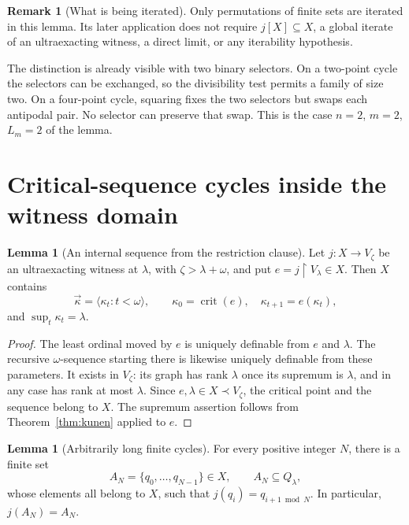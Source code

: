 \documentclass[11pt,letterpaper]{article}
\theoremstyle{definition}
\newtheorem{lemma}[definition]{Lemma}
\newcommand{\crit}{\operatorname{crit}}
\newcommand{\restr}{\mathbin{\upharpoonright}}
\newtheorem{remark}[definition]{Remark}
\begin{document}
\begin{remark}[What is being iterated]
Only permutations of finite sets are iterated in this lemma. Its later application does not require $j[X]\subseteq X$, a global iterate of an ultraexacting witness, a direct limit, or any iterability hypothesis.
\end{remark}

The distinction is already visible with two binary selectors. On a two-point cycle the selectors can be exchanged, so the divisibility test permits a family of size two. On a four-point cycle, squaring fixes the two selectors but swaps each antipodal pair. No selector can preserve that swap. This is the case $n=2$, $m=2$, $L_m=2$ of the lemma.

\section{Critical-sequence cycles inside the witness domain}\label{sec:cycles}

\begin{lemma}[An internal sequence from the restriction clause]\label{lem:sequence}
Let $j:X\to V_\zeta$ be an ultraexacting witness at $\lambda$, with $\zeta>\lambda+\omega$, and put $e=j\restr V_\lambda\in X$. Then $X$ contains
\[
 \vec\kappa=\langle\kappa_t:t<\omega\rangle,
 \qquad \kappa_0=\crit(e),\quad \kappa_{t+1}=e(\kappa_t),
\]
and $\sup_t\kappa_t=\lambda$.
\end{lemma}

\begin{proof}
The least ordinal moved by $e$ is uniquely definable from $e$ and $\lambda$. The recursive $\omega$-sequence starting there is likewise uniquely definable from these parameters. It exists in $V_\zeta$: its graph has rank $\lambda$ once its supremum is $\lambda$, and in any case has rank at most $\lambda$. Since $e,\lambda\in X\prec V_\zeta$, the critical point and the sequence belong to $X$. The supremum assertion follows from Theorem~\ref{thm:kunen} applied to $e$.
\end{proof}

\begin{lemma}[Arbitrarily long finite cycles]\label{lem:cycles}
For every positive integer $N$, there is a finite set
\[
 A_N=\{q_0,\ldots,q_{N-1}\}\in X,
 \qquad A_N\subseteq Q_\lambda,
\]
whose elements all belong to $X$, such that $j(q_i)=q_{i+1\bmod N}$. In particular, $j(A_N)=A_N$.
\end{lemma}
\end{document}
